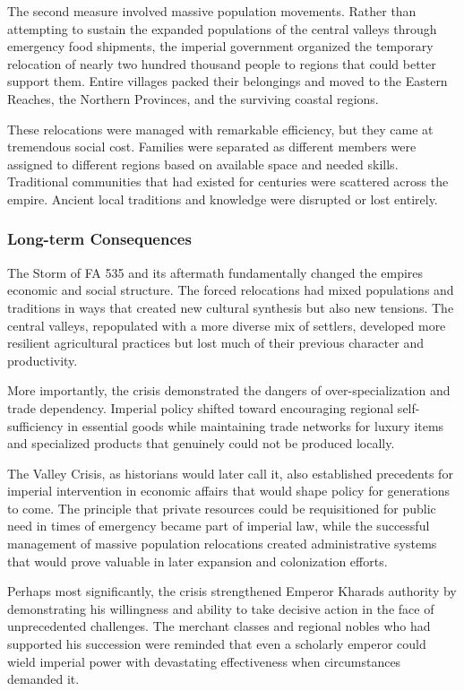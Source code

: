 The second measure involved massive population movements. Rather than
attempting to sustain the expanded populations of the central valleys
through emergency food shipments, the imperial government organized the
temporary relocation of nearly two hundred thousand people to regions
that could better support them. Entire villages packed their belongings
and moved to the Eastern Reaches, the Northern Provinces, and the
surviving coastal regions.

These relocations were managed with remarkable efficiency, but they came
at tremendous social cost. Families were separated as different members
were assigned to different regions based on available space and needed
skills. Traditional communities that had existed for centuries were
scattered across the empire. Ancient local traditions and knowledge were
disrupted or lost entirely.

\subsubsection{Long-term Consequences}\label{long-term-consequences}

The Storm of FA 535 and its aftermath fundamentally changed the
empire\textquotesingle s economic and social structure. The forced
relocations had mixed populations and traditions in ways that created
new cultural synthesis but also new tensions. The central valleys,
repopulated with a more diverse mix of settlers, developed more
resilient agricultural practices but lost much of their previous
character and productivity.

More importantly, the crisis demonstrated the dangers of
over-specialization and trade dependency. Imperial policy shifted toward
encouraging regional self-sufficiency in essential goods while
maintaining trade networks for luxury items and specialized products
that genuinely could not be produced locally.

The Valley Crisis, as historians would later call it, also established
precedents for imperial intervention in economic affairs that would
shape policy for generations to come. The principle that private
resources could be requisitioned for public need in times of emergency
became part of imperial law, while the successful management of massive
population relocations created administrative systems that would prove
valuable in later expansion and colonization efforts.

Perhaps most significantly, the crisis strengthened Emperor
Kharad\textquotesingle s authority by demonstrating his willingness and
ability to take decisive action in the face of unprecedented challenges.
The merchant classes and regional nobles who had supported his
succession were reminded that even a scholarly emperor could wield
imperial power with devastating effectiveness when circumstances
demanded it.

